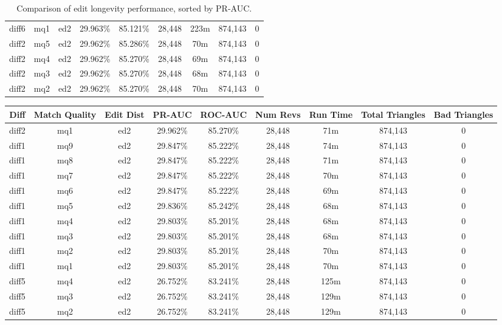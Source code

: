 \begin{sidewaystable}[!ph]
\begin{center}
\begin{tabular}{|c|c|c||c|c||c|c|c|c|}
diff6 & mq1 & ed2 & 29.963\% & 85.121\% & 28,448 & 223m & 874,143 & 0 \\
diff2 & mq5 & ed2 & 29.962\% & 85.286\% & 28,448 & 70m & 874,143 & 0 \\
diff2 & mq4 & ed2 & 29.962\% & 85.270\% & 28,448 & 69m & 874,143 & 0 \\
diff2 & mq3 & ed2 & 29.962\% & 85.270\% & 28,448 & 68m & 874,143 & 0 \\
diff2 & mq2 & ed2 & 29.962\% & 85.270\% & 28,448 & 70m & 874,143 & 0 \\
\hline
\end{tabular}
\end{center}
\caption{Comparison of edit longevity performance,
    sorted by PR-AUC.}
\label{tab:editshoutJ}
\end{sidewaystable}
\clearpage
\begin{sidewaystable}[!ph]
  \begin{center}
    \begin{tabular}{|c|c|c||c|c||c|c|c|c|}
\hline
Diff & Match Quality & Edit Dist
        & PR-AUC & ROC-AUC
        & Num Revs & Run Time
        & Total Triangles & Bad Triangles \\
\hline
\hline
diff2 & mq1 & ed2 & 29.962\% & 85.270\% & 28,448 & 71m & 874,143 & 0 \\
diff1 & mq9 & ed2 & 29.847\% & 85.222\% & 28,448 & 74m & 874,143 & 0 \\
diff1 & mq8 & ed2 & 29.847\% & 85.222\% & 28,448 & 71m & 874,143 & 0 \\
diff1 & mq7 & ed2 & 29.847\% & 85.222\% & 28,448 & 70m & 874,143 & 0 \\
diff1 & mq6 & ed2 & 29.847\% & 85.222\% & 28,448 & 69m & 874,143 & 0 \\
diff1 & mq5 & ed2 & 29.836\% & 85.242\% & 28,448 & 68m & 874,143 & 0 \\
diff1 & mq4 & ed2 & 29.803\% & 85.201\% & 28,448 & 68m & 874,143 & 0 \\
diff1 & mq3 & ed2 & 29.803\% & 85.201\% & 28,448 & 68m & 874,143 & 0 \\
diff1 & mq2 & ed2 & 29.803\% & 85.201\% & 28,448 & 70m & 874,143 & 0 \\
diff1 & mq1 & ed2 & 29.803\% & 85.201\% & 28,448 & 70m & 874,143 & 0 \\
diff5 & mq4 & ed2 & 26.752\% & 83.241\% & 28,448 & 125m & 874,143 & 0 \\
diff5 & mq3 & ed2 & 26.752\% & 83.241\% & 28,448 & 129m & 874,143 & 0 \\
diff5 & mq2 & ed2 & 26.752\% & 83.241\% & 28,448 & 129m & 874,143 & 0 \\

\end{tabular}
\end{center}
\end{sidewaystable}

